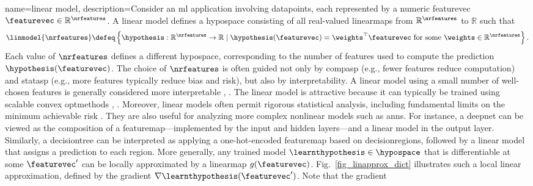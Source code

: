 {name={linear model}, 
	description={Consider an \gls{ml} application involving \glspl{datapoint}, each represented 
		by a numeric \gls{featurevec} $\featurevec \in \mathbb{R}^{\nrfeatures}$. A linear \gls{model} defines 
		a \gls{hypospace} consisting of all real-valued \glspl{linearmap} from $\mathbb{R}^{\nrfeatures}$ to $\mathbb{R}$ such that
		\begin{equation}
			\nonumber
			\label{equ_def_lin_model_hypspace_dict}
			\linmodel{\nrfeatures} \defeq \left\{ \hypothesis: \mathbb{R}^{\nrfeatures} \rightarrow \mathbb{R} \mid \hypothesis(\featurevec) = \weights^{\top} \featurevec \text{ for some } \weights \in \mathbb{R}^{\nrfeatures} \right\}.
		\end{equation}
		Each value of $\nrfeatures$ defines a different \gls{hypospace}, corresponding to the number of 
		\glspl{feature} used to compute the \gls{prediction} $\hypothesis(\featurevec)$. The choice of 
		$\nrfeatures$ is often guided not only by \gls{compasp} (e.g., fewer features reduce computation) and 
		\gls{statasp} (e.g., more features typically reduce \gls{bias} and \gls{risk}), but also by \gls{interpretability}. 
		A linear \gls{model} using a small number of well-chosen \glspl{feature} is generally considered 
		more interpretable \cite{rudin2019stop}, \cite{Ribeiro2016}.
		The linear \gls{model} is attractive because it can typically be trained using scalable \gls{convex} 
		\glspl{optmethod} \cite{hastie01statisticallearning}, \cite{BertsekasNonLinProgr}. 
		Moreover, linear \glspl{model} often permit rigorous 
		statistical analysis, including fundamental limits on the \gls{minimum} achievable \gls{risk} \cite{Wain2019}. 
		They are also useful for analyzing more complex nonlinear \glspl{model} such as \glspl{ann}. For instance, 
		a \gls{deepnet} can be viewed as the composition of a \gls{featuremap}—implemented by the input and 
		hidden \glspl{layer}—and a linear \gls{model} in the output \gls{layer}. Similarly, a \gls{decisiontree} can be interpreted 
		as applying a one-hot-encoded \gls{featuremap} based on \glspl{decisionregion}, followed by a linear 
		\gls{model} that assigns a \gls{prediction} to each region.
		More generally, any trained \gls{model} $\learnthypothesis \in \hypospace$ that is 
		\gls{differentiable} at some $\featurevec'$ can be locally approximated by a \gls{linearmap} 
		$g(\featurevec)$. Fig.~\ref{fig_linapprox_dict} illustrates such a local linear approximation, 
		defined by the \gls{gradient} $\nabla \learnthypothesis(\featurevec')$. Note that the \gls{gradient} 
}}
